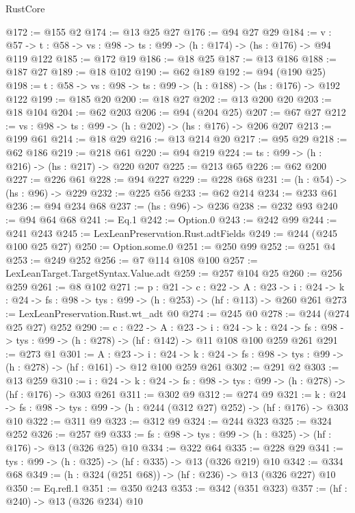 \begin{lexlean}{RustCore}
\begin{coremodule}
@172 := @155 @2
@174 := @13 @25 @27
@176 := @94 @27 @29
@184 := {v : @57} ->
  {t : @58} -> {vs : @98} -> {ts : @99} -> (h : @174) -> (hs : @176) -> @94 @119 @122
@185 := @172 @19
@186 := @18 @25
@187 := @13 @186
@188 := @187 @27
@189 := @18 @102
@190 := @62 @189
@192 := @94 (@190 @25)
@198 := {t : @58} -> {vs : @98} -> {ts : @99} -> (h : @188) -> (hs : @176) -> @192 @122
@199 := @185 @20
@200 := @18 @27
@202 := @13 @200 @20
@203 := @18 @104
@204 := @62 @203
@206 := @94 (@204 @25)
@207 := @67 @27
@212 := {vs : @98} -> {ts : @99} -> (h : @202) -> (hs : @176) -> @206 @207
@213 := @199 @61
@214 := @18 @29
@216 := @13 @214 @20
@217 := @95 @29
@218 := @62 @186
@219 := @218 @61
@220 := @94 @219
@224 := {ts : @99} -> (h : @216) -> (hs : @217) -> @220 @207
@225 := @213 @65
@226 := @62 @200
@227 := @226 @61
@228 := @94 @227
@229 := @228 @68
@231 := (h : @54) -> (hs : @96) -> @229
@232 := @225 @56
@233 := @62 @214
@234 := @233 @61
@236 := @94 @234 @68
@237 := (hs : @96) -> @236
@238 := @232 @93
@240 := @94 @64 @68
@241 := Eq.{1}
@242 := Option.{0}
@243 := @242 @99
@244 := @241 @243
@245 := LexLeanPreservation.Rust.adtFields
@249 := @244 (@245 @100 @25 @27)
@250 := Option.some.{0}
@251 := @250 @99
@252 := @251 @4
@253 := @249 @252
@256 := @7 @114 @108 @100
@257 := LexLeanTarget.TargetSyntax.Value.adt
@259 := @257 @104 @25
@260 := @256 @259
@261 := @8 @102
@271 := {p : @21} ->
  {c : @22} ->
  {A : @23} ->
  {i : @24} -> {k : @24} -> {fs : @98} -> {tys : @99} -> (h : @253) -> (hf : @113) -> @260 @261
@273 := LexLeanPreservation.Rust.wt_adt @0
@274 := @245 @0
@278 := @244 (@274 @25 @27) @252
@290 := {c : @22} ->
  {A : @23} ->
  {i : @24} ->
  {k : @24} -> {fs : @98} -> {tys : @99} -> (h : @278) -> (hf : @142) -> @11 @108 @100 @259 @261
@291 := @273 @1
@301 := {A : @23} ->
  {i : @24} ->
  {k : @24} -> {fs : @98} -> {tys : @99} -> (h : @278) -> (hf : @161) -> @12 @100 @259 @261
@302 := @291 @2
@303 := @13 @259
@310 := {i : @24} ->
  {k : @24} -> {fs : @98} -> {tys : @99} -> (h : @278) -> (hf : @176) -> @303 @261
@311 := @302 @9
@312 := @274 @9
@321 := {k : @24} ->
  {fs : @98} -> {tys : @99} -> (h : @244 (@312 @27) @252) -> (hf : @176) -> @303 @10
@322 := @311 @9
@323 := @312 @9
@324 := @244 @323
@325 := @324 @252
@326 := @257 @9
@333 := {fs : @98} -> {tys : @99} -> (h : @325) -> (hf : @176) -> @13 (@326 @25) @10
@334 := @322 @64
@335 := @228 @29
@341 := {tys : @99} -> (h : @325) -> (hf : @335) -> @13 (@326 @219) @10
@342 := @334 @68
@349 := (h : @324 (@251 @68)) -> (hf : @236) -> @13 (@326 @227) @10
@350 := Eq.refl.{1}
@351 := @350 @243
@353 := @342 (@351 @323)
@357 := (hf : @240) -> @13 (@326 @234) @10

\end{coremodule}
\end{lexlean}
